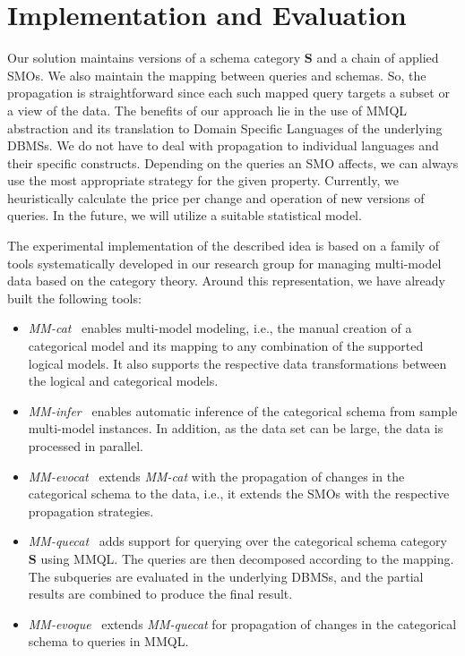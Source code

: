 
\section{Implementation and Evaluation}

Our solution maintains versions of a schema category $\mathbf{S}$ and a chain of applied SMOs. %
We also maintain the mapping between queries and schemas. So, the propagation is straightforward since each such mapped query targets a subset or a view of the data.
%
The benefits of our approach lie in the use of MMQL abstraction and its translation to Domain Specific Languages of the underlying DBMSs. We do not have to deal with propagation to individual languages and their specific constructs. Depending on the queries an SMO affects, we can always use the most appropriate strategy for the given property. 
Currently, we heuristically calculate the price per change and operation of new versions of queries. In the future, we will utilize a suitable statistical model.

The experimental implementation of the described idea is based on a family of tools systematically developed in our research group for managing multi-model data based on the category theory. %
Around this representation, we have already built the following tools: 
\begin{itemize}
    \item \textit{MM-cat}~\citep{mm_cat} enables multi-model modeling, i.e., the manual creation of a categorical model and its mapping to any combination of the supported logical models. It also supports the respective data transformations between the logical and categorical models.
    \item \textit{MM-infer}~\citep{koupil2022mminfer} enables automatic inference of the categorical schema from sample multi-model instances. In addition, as the data set can be large, the data is processed in parallel.
    \item \textit{MM-evocat}~\citep{cikm_2022} extends \textit{MM-cat} with the propagation of changes in the categorical schema to the data, i.e., it extends the SMOs with the respective propagation strategies.
    \item \textit{MM-quecat}~\citep{mm_quecat} adds support for querying over the categorical schema category $\mathbf{S}$ using MMQL. The queries are then decomposed according to the mapping. The subqueries are evaluated in the underlying DBMSs, and the partial results are combined to produce the final result.
    \item \textit{MM-evoque}~\citep{edbt_2024} extends \textit{MM-quecat} for propagation of changes in the categorical schema to queries in MMQL.
\end{itemize}

